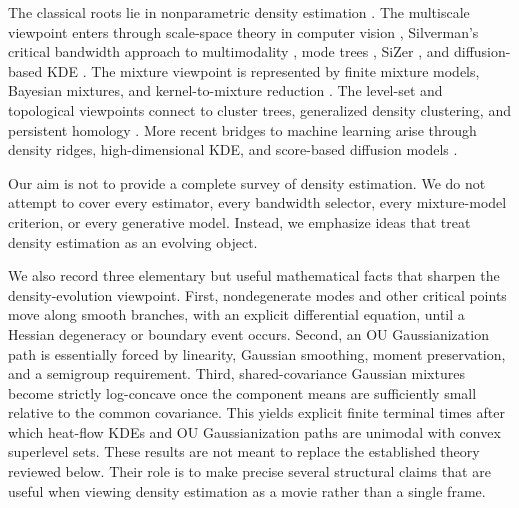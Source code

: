 \documentclass[preprint]{imsart}
\theoremstyle{plain}
\theoremstyle{definition}
\begin{document}
The classical roots lie in nonparametric density estimation \citep{rosenblatt_1956_RemarksNonparametricEstimates, parzen_1962_EstimationProbabilityDensity,wand_1994_KernelSmoothing,scott_2015_MultivariateDensityEstimation}. The multiscale viewpoint enters through scale-space theory in computer vision \citep{witkin_1983_ScalespaceFiltering, koenderink_1984_StructureImages, babaud_1986_UniquenessGaussianKernel, lindeberg_1994_ScalespaceTheoryBasic}, Silverman's critical bandwidth approach to multimodality \citep{silverman_1981_UsingKernelDensity}, mode trees \citep{minnotte_1993_ModeTreeTool}, SiZer \citep{chaudhuri_1999_SiZerExplorationStructures, chaudhuri_2000_ScaleSpaceView}, and diffusion-based KDE \citep{botev_2010_KernelDensityEstimation}.  The mixture viewpoint is represented by finite mixture models, Bayesian mixtures, and kernel-to-mixture reduction \citep{lindsay_1995_MixtureModelsTheory, richardson_1997_BayesianAnalysisMixtures, scott_2001_KernelsMixtures, fraley_2002_ModelBasedClusteringDiscriminant, mclachlan_2019_FiniteMixtureModels}.
The level-set and topological viewpoints connect to cluster trees, generalized density clustering, and persistent homology 
\citep{hartigan_1975_ClusteringAlgorithms, polonik_1995_MeasuringMassConcentrations, tsybakov_1997_NonparametricEstimationDensity, 
edelsbrunner_2002_TopologicalPersistenceSimplification,rinaldo_2010_GeneralizedDensityClustering, chaudhuri_2014_ConsistentProceduresCluster, fasy_2014_ConfidenceSetsPersistence, chazal_2018_RobustTopologicalInference}. More recent bridges to machine learning arise through density ridges, high-dimensional KDE, and score-based diffusion models 
\citep{genovese_2014_NonparametricRidgeEstimation, chen_2015_AsymptoticTheoryDensity, sohl-dickstein_2015_DeepUnsupervisedLearning, song_2019_GenerativeModelingEstimating, ho_2020_DenoisingDiffusionProbabilistic, song_2020_ScoreBasedGenerativeModeling,biroli_2026_KernelDensityEstimators}.


Our aim is not to provide a complete survey of density estimation. We do not attempt to cover every estimator, every bandwidth selector, every mixture-model criterion, or every generative model. Instead, we emphasize ideas that treat density estimation as an evolving object. 

We also record three elementary but useful mathematical facts that sharpen the density-evolution viewpoint. First, nondegenerate modes and other critical points move along smooth branches, with an explicit differential equation, until a Hessian degeneracy or boundary event occurs. Second, an OU Gaussianization path is essentially forced by linearity, Gaussian smoothing, moment preservation, and a semigroup requirement. Third, shared-covariance Gaussian mixtures become strictly log-concave once the component means are sufficiently small relative to the common covariance. This yields explicit finite terminal times after which heat-flow KDEs and OU Gaussianization paths are unimodal with convex superlevel sets. These results are not meant to replace the established theory reviewed below. Their role is to make precise several structural claims that are useful when viewing density estimation as a movie rather than a single frame. 
\end{document}
